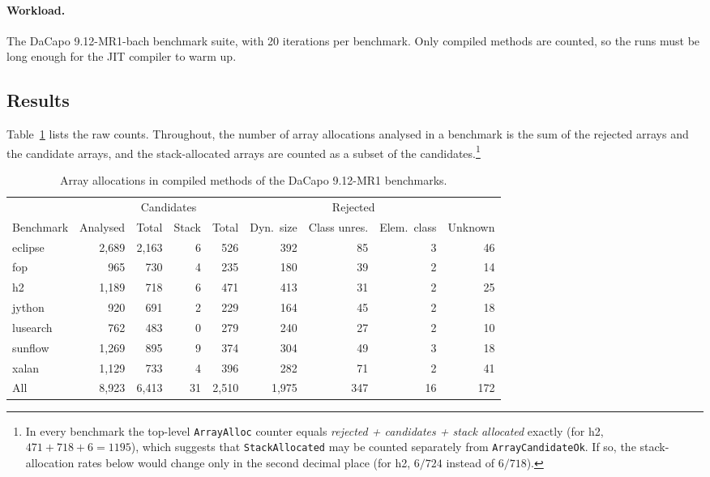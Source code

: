 \paragraph{Workload.} The DaCapo 9.12-MR1-bach benchmark suite, with 20 iterations per
benchmark. Only compiled methods are counted, so the runs must be long enough for the JIT
compiler to warm up.

\subsection{Results}

Table~\ref{tab:arrays} lists the raw counts. Throughout, the number of array allocations
analysed in a benchmark is the sum of the rejected arrays and the candidate arrays, and the
stack-allocated arrays are counted as a subset of the candidates.\footnote{In every benchmark
the top-level \texttt{ArrayAlloc} counter equals \emph{rejected + candidates + stack allocated}
exactly (for h2, $471 + 718 + 6 = 1195$), which suggests that \texttt{StackAllocated} may be
counted separately from \texttt{ArrayCandidateOk}. If so, the stack-allocation rates below
would change only in the second decimal place (for h2, $6/724$ instead of $6/718$).}

\begin{table}[htbp]
  \centering
  \small
  \setlength{\tabcolsep}{5pt}
  \begin{tabular}{@{}lrrrrrrrr@{}}
    \toprule
    & & \multicolumn{2}{c}{Candidates} & \multicolumn{5}{c}{Rejected} \\
    \cmidrule(lr){3-4} \cmidrule(l){5-9}
    Benchmark & Analysed & Total & Stack & Total & Dyn.\ size & Class unres. & Elem.\ class & Unknown \\
    \midrule
    eclipse  & 2{,}689 & 2{,}163 & 6 & 526 & 392 & 85 & 3 & 46 \\
    fop      & 965     & 730     & 4 & 235 & 180 & 39 & 2 & 14 \\
    h2       & 1{,}189 & 718     & 6 & 471 & 413 & 31 & 2 & 25 \\
    jython   & 920     & 691     & 2 & 229 & 164 & 45 & 2 & 18 \\
    lusearch & 762     & 483     & 0 & 279 & 240 & 27 & 2 & 10 \\
    sunflow  & 1{,}269 & 895     & 9 & 374 & 304 & 49 & 3 & 18 \\
    xalan    & 1{,}129 & 733     & 4 & 396 & 282 & 71 & 2 & 41 \\
    \midrule
    All      & 8{,}923 & 6{,}413 & 31 & 2{,}510 & 1{,}975 & 347 & 16 & 172 \\
    \bottomrule
  \end{tabular}
  \caption{Array allocations in compiled methods of the DaCapo 9.12-MR1 benchmarks.}
  \label{tab:arrays}
\end{table}

